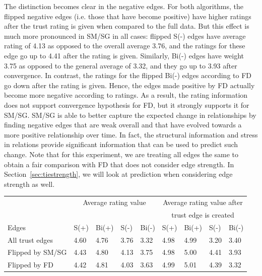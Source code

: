 \documentclass[acmtweb]{acmsmall}
\begin{document}
The distinction becomes clear in the negative edges.  For both
algorithms, the flipped negative edges (i.e. those that have become
positive) have higher ratings after the trust rating is given when
compared to the full data. But this effect is much more pronounced in
SM/SG in all cases: flipped S(-) edges have average rating of 4.13 as
opposed to the overall average 3.76, and the ratings for these edge go
up to 4.41 after the rating is given. Similarly, Bi(-) edges have
weight 3.75 as opposed to the general average of 3.32, and they go up
to 3.93 after convergence. In contrast, the ratings for the flipped
Bi(-) edges according to FD go down after the rating is given. Hence,
the edges made positive by FD actually become more negative according
to ratings. As a result, the rating information does not support
convergence hypothesis for FD, but it strongly supports it for
SM/SG. SM/SG is able to better capture the expected change in
relationships by finding negative edges that are weak overall and that
have evolved towards a more positive relationship over time. In fact,
the structural information and stress in relations provide significant
information that can be used to predict such change. Note that for
this experiment, we are treating all edges the same to obtain a fair
comparison with FD that does not consider edge strength. In
Section~\ref{sec:tiestrength}, we will look at prediction when
considering edge strength as well.

\begin{table}[h]
 {
\begin{tabular}{l|llll|llll} 
\multicolumn{1}{c}{} & \multicolumn{4}{c}{Average rating value} &
  \multicolumn{4}{c}{Average rating value after} \\ 
\multicolumn{1}{c}{} & \multicolumn{4}{c}{} &
  \multicolumn{4}{c}{trust edge is created} \\ 
Edges & S(+) & Bi(+) & S(-) & Bi(-) & S(+) & Bi(+) & S(-) & Bi(-)  \\ \hline
All trust edges & 
4.60 & 4.76 & 3.76 & 3.32 & 4.98 & 4.99 & 3.20 & 3.40 \\
Flipped by SM/SG &
4.43 & 4.80 & 4.13 & 3.75 & 4.98 & 5.00 & 4.41 & 3.93 \\
Flipped by FD & 
4.42 & 4.81 & 4.03 & 3.63 & 4.99 & 5.01 & 4.39 & 3.32 \\
\end{tabular}}
\end{table}
\end{document}
